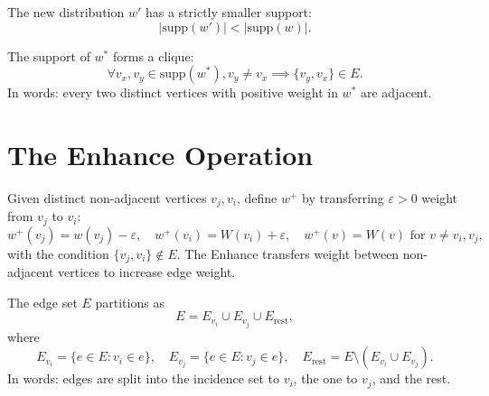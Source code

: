 \begin{lemma}
    \label{lem:Improve_support_strictly_reduced}
The new distribution \(w'\) has a strictly smaller support:
\[
|\mathrm{supp}(w')| < |\mathrm{supp}(w)|.
\]
\end{lemma}

\begin{theorem}
    \label{thm:Better_forms_clique}
The support of \(w^*\) forms a clique:
\[
\forall v_x, v_y \in \mathrm{supp}(w^*), v_y \neq v_x \implies \{v_y, v_x\} \in E.
\]
In words: every two distinct vertices with positive weight in \(w^*\) are adjacent.
\end{theorem}

\section{The Enhance Operation}

\begin{definition}
  \label{def:Enhance}
  \leanok
Given distinct non-adjacent vertices \(v_j, v_i\), define \(w^+\) by transferring \(\varepsilon > 0\) weight from \(v_j\) to \(v_i\):
\[
w^+(v_j) = w(v_j) - \varepsilon, \quad w^+(v_i) = W(v_i) + \varepsilon, \quad w^+(v) = W(v) \text{ for } v \neq v_i, v_j,
\]
with the condition \(\{v_j, v_i\} \notin E\).
The Enhance transfers weight between non-adjacent vertices to increase edge weight.
\end{definition}

\begin{lemma}
  \label{lem:supported_edge_partition}
  \leanok
The edge set \(E\) partitions as
\[
E = E_{v_i} \cup E_{v_j} \cup E_{\mathrm{rest}},
\]
where
\[
E_{v_i} = \{e \in E : v_i \in e\}, \quad E_{v_j} = \{e \in E : v_j \in e\}, \quad E_{\mathrm{rest}} = E \setminus (E_{v_i} \cup E_{v_j}).
\]
In words: edges are split into the incidence set to \(v_i\), the one to \(v_j\), and the rest.
\end{lemma}

